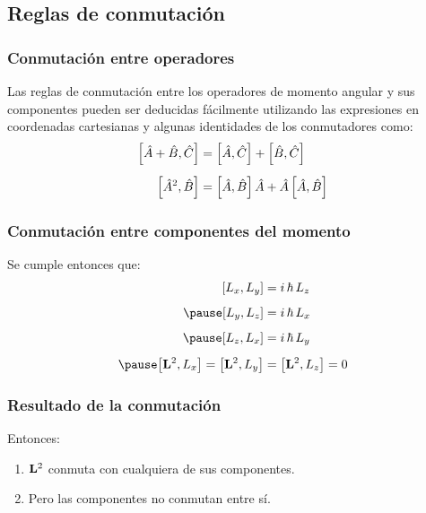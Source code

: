 \documentclass[12pt]{beamer}
\begin{document}

\subsection{Reglas de conmutación}

\begin{frame}
\frametitle{Conmutación entre operadores}
Las reglas de conmutación entre los operadores de momento angular y sus componentes pueden ser deducidas fácilmente utilizando las expresiones en coordenadas cartesianas y algunas identidades de los conmutadores como:
\pause
\begin{eqnarray*}
\begin{aligned}
\comm{\hat{A} + \hat{B}}{\hat{C}} &= \comm{\hat{A}}{\hat{C}} + \comm{\hat{B}}{\hat{C}} \\[0.5em]
\comm{\hat{A}^{2}}{\hat{B}} &= \comm{\hat{A}}{\hat{B}} \, \hat{A} + \hat{A} \, \comm{\hat{A}}{\hat{B}}
\end{aligned}
\end{eqnarray*}
\end{frame}
\begin{frame}
\frametitle{Conmutación entre componentes del momento}
Se cumple entonces que:
\pause
\begin{eqnarray}
\begin{aligned}
\comm{L_{x}}{L_{y}} &= i \, \hbar \, L_{z} \\[0.5em] \pause
\comm{L_{y}}{L_{z}} &= i \, \hbar \, L_{x} \\[0.5em] \pause
\comm{L_{z}}{L_{x}} &= i \, \hbar \, L_{y} \\[0.5em] \pause
\comm{\vb{L}^{2}}{L_{x}} = \comm{\vb{L}^{2}}{L_{y}} &= \comm{\vb{L}^{2}}{L_{z}} = 0
\end{aligned}
\label{eq:ecuacion_01_07}
\end{eqnarray}
\end{frame}
\begin{frame}
\frametitle{Resultado de la conmutación}
Entonces: \pause
{}
\begin{enumerate}[<+->]
\item $\vb{L}^{2}$ conmuta con cualquiera de sus componentes.
\item Pero las componentes no conmutan entre sí.
\end{enumerate}
\end{frame}
\end{document}
